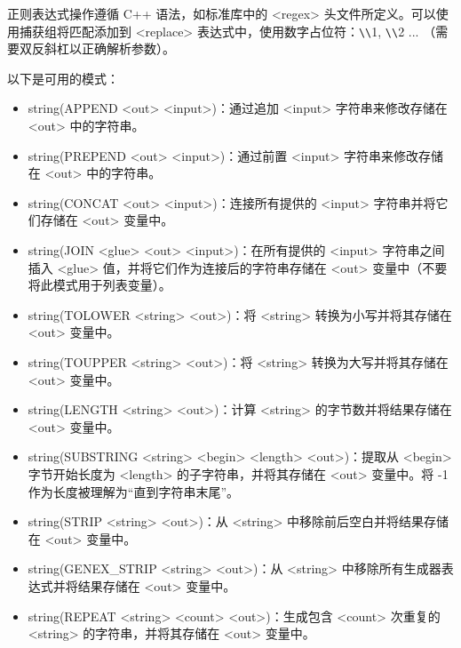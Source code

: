 正则表达式操作遵循 C++ 语法，如标准库中的 <regex> 头文件所定义。可以使用捕获组将匹配添加到 <replace> 表达式中，使用数字占位符：\verb|\\|1, \verb|\\|2 ... （需要双反斜杠以正确解析参数）。


以下是可用的模式：

\begin{itemize}
\item
string(APPEND <out> <input>)：通过追加 <input> 字符串来修改存储在 <out> 中的字符串。

\item
string(PREPEND <out> <input>)：通过前置 <input> 字符串来修改存储在 <out> 中的字符串。

\item
string(CONCAT <out> <input>)：连接所有提供的 <input> 字符串并将它们存储在 <out> 变量中。

\item
string(JOIN <glue> <out> <input>)：在所有提供的 <input> 字符串之间插入 <glue> 值，并将它们作为连接后的字符串存储在 <out> 变量中（不要将此模式用于列表变量）。

\item
string(TOLOWER <string> <out>)：将 <string> 转换为小写并将其存储在 <out> 变量中。

\item
string(TOUPPER <string> <out>)：将 <string> 转换为大写并将其存储在 <out> 变量中。

\item
string(LENGTH <string> <out>)：计算 <string> 的字节数并将结果存储在 <out> 变量中。

\item
string(SUBSTRING <string> <begin> <length> <out>)：提取从 <begin> 字节开始长度为 <length> 的子字符串，并将其存储在 <out> 变量中。将 -1 作为长度被理解为“直到字符串末尾”。

\item
string(STRIP <string> <out>)：从 <string> 中移除前后空白并将结果存储在 <out> 变量中。

\item
string(GENEX\_STRIP <string> <out>)：从 <string> 中移除所有生成器表达式并将结果存储在 <out> 变量中。

\item
string(REPEAT <string> <count> <out>)：生成包含 <count> 次重复的 <string> 的字符串，并将其存储在 <out> 变量中。
\end{itemize}

